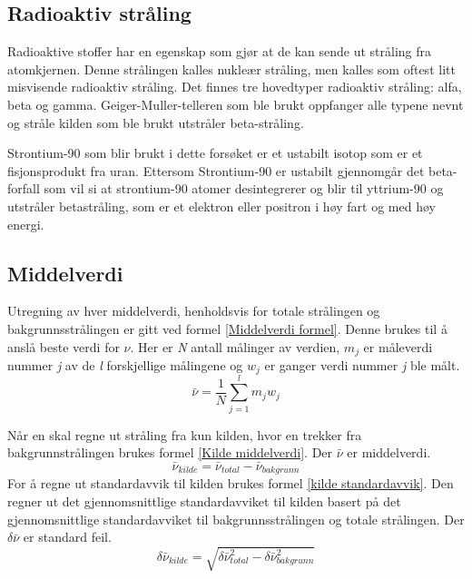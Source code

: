 \documentclass[twocolumn, 11pt]{article} %
\begin{document}
    \subsection{Radioaktiv stråling}
    Radioaktive stoffer har en egenskap som gjør at de kan sende ut stråling fra atomkjernen. Denne strålingen kalles nukleær stråling, men kalles som oftest litt misvisende radioaktiv stråling. Det finnes tre hovedtyper radioaktiv stråling: alfa, beta og gamma. Geiger-Muller-telleren som ble brukt oppfanger alle typene nevnt og stråle kilden som ble brukt utstråler beta-stråling\cite{radioaktivitet}.

    \bigskip
    Strontium-90 som blir brukt i dette forsøket er et ustabilt isotop som er et fisjonsprodukt fra uran. Ettersom Strontium-90 er ustabilt gjennomgår det beta-forfall som vil si at strontium-90 atomer desintegrerer og blir til yttrium-90 og utstråler betastråling, som er et elektron eller positron i høy fart og med høy energi\cite{strontium-90}.

    \subsection{Middelverdi}
    Utregning av hver middelverdi, henholdsvis for totale strålingen og bakgrunnsstrålingen er gitt ved formel \eqref{Middelverdi formel}. Denne brukes til å anslå beste verdi for $\nu$. Her er \textit{N} antall målinger av verdien, \textit{$m_j$} er måleverdi nummer \textit{j} av de \textit{l} forskjellige målingene og \textit{$w_j$} er ganger verdi nummer \textit{j} ble målt.
    \begin{equation}
        \bar{\nu} = \frac{1}{N}\sum_{j=1}^l m_j w_j
        \label{Middelverdi formel}
    \end{equation}


    Når en skal regne ut stråling fra kun kilden, hvor en trekker fra bakgrunnstrålingen brukes formel \eqref{Kilde middelverdi}. Der \textit{$\bar\nu$} er middelverdi.
    \begin{equation}
	\bar{\nu}_{kilde} = \bar{\nu}_{total} - \bar{\nu}_{bakgrunn}
    \label{Kilde middelverdi}
    \end{equation}
    For å regne ut standardavvik til kilden brukes formel \eqref{kilde standardavvik}. Den regner ut det gjennomsnittlige standardavviket til kilden basert på det gjennomsnittlige standardavviket til bakgrunnsstrålingen og totale strålingen. Der \textit{$\delta\bar\nu$} er standard feil\cite{oppgavetekst}.
    \begin{equation}
	\delta \bar{\nu}_{kilde} = \sqrt{ \delta \bar{\nu}_{total}^2 - \delta \bar{\nu}_{bakgrunn}^2 }
    \label{kilde standardavvik}
    \end{equation}
\end{document}
